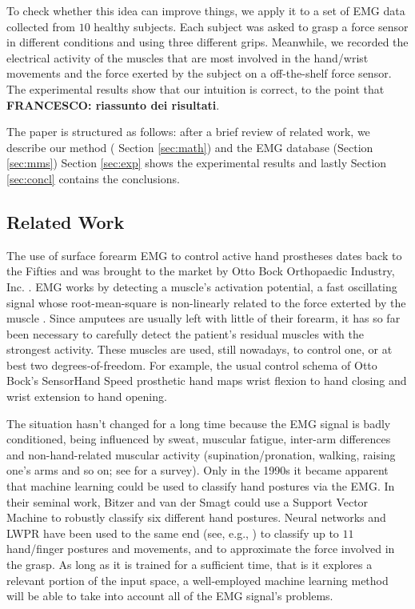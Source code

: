 To check whether this idea can improve things, we apply it to a set of
EMG data collected from $10$ healthy subjects. Each subject was asked
to grasp a force sensor in different conditions and using three
different grips. Meanwhile, we recorded the electrical activity of the
muscles that are most involved in the hand/wrist movements and the
force exerted by the subject on a off-the-shelf force sensor. The
experimental results show that our intuition is correct, to the point
that \textbf{FRANCESCO: riassunto dei risultati}.

The paper is structured as follows: after a brief review of related
work, 
we describe our method (
Section \ref{sec:math}) and the EMG database (Section \ref{sec:mms}) %
Section \ref{sec:exp}
shows the experimental results and lastly Section \ref{sec:concl}
contains the conclusions.

\subsection{Related Work}

The use of surface forearm EMG to control active hand prostheses dates
back to the Fifties and was brought to the market by Otto Bock
Orthopaedic Industry, Inc. \cite{history}. EMG works by detecting a
muscle's activation potential, a fast oscillating signal whose
root-mean-square is non-linearly related to the force exterted by the
muscle \cite{deluca}. Since amputees are usually left with little of
their forearm, it has so far been necessary to carefully detect the
patient's residual muscles with the strongest activity. These muscles
are used, still nowadays, to control one, or at best two
degrees-of-freedom. For example, the usual control schema of Otto
Bock's SensorHand Speed prosthetic hand maps wrist flexion to hand
closing and wrist extension to hand opening.

The situation hasn't changed for a long time because the EMG signal is
badly conditioned, being influenced by sweat, muscular fatigue,
inter-arm differences and non-hand-related muscular activity
(supination/pronation, walking, raising one's arms and so on; see
\cite{zecca} for a survey). Only in the 1990s it became apparent that
machine learning could be used to classify hand postures via the
EMG. In their seminal work, Bitzer and van der Smagt \cite{smagt}
could use a Support Vector Machine to robustly classify six different
hand postures. Neural networks and LWPR \cite{lwpr} have been used to
the same end (see, e.g., \cite{2008.ICRA,2008.BioCyb,Sebelius2005}) to
classify up to $11$ hand/finger postures and movements, and to
approximate the force involved in the grasp. As long as it is trained
for a sufficient time, that is it explores a relevant portion of the
input space, a well-employed machine learning method will be able to
take into account all of the EMG signal's problems.


